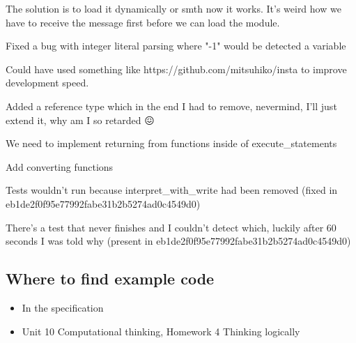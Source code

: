 \documentclass{article}
\begin{document}
The solution is to load it dynamically or smth now it works. It's weird how we
have to receive the message first before we can load the module.

Fixed a bug with integer literal parsing where "-1" would be detected a
variable

Could have used something like https://github.com/mitsuhiko/insta to improve
development speed.

Added a reference type which in the end I had to remove, nevermind, I'll just
extend it, why am I so retarded 😖

We need to implement returning from functions inside of execute\_statements

Add converting functions

Tests wouldn't run because interpret\_with\_write had been removed (fixed in
eb1de2f0f95e77992fabe31b2b5274ad0c4549d0)

There's a test that never finishes and I couldn't detect which, luckily after
60 seconds I was told why (present in eb1de2f0f95e77992fabe31b2b5274ad0c4549d0)

\subsection{Where to find example code}

\begin{itemize}
	\item In the specification
	\item Unit 10 Computational thinking, Homework 4 Thinking logically
\end{itemize}

\printbibliography[heading=bibintoc]
\end{document}
